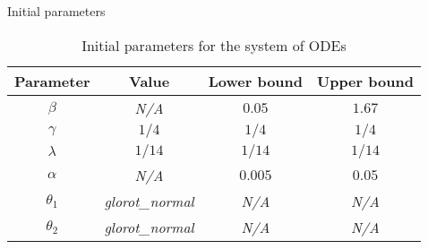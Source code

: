 \begin{frame}{Initial parameters}
    \begin{table}[h]
        \centering
        \begin{tabular}{| c | c | c | c |}
            Parameter & Value & Lower bound & Upper bound \\
            \hline\hline
            $\beta$ & \textit{N/A} & $0.05$ & $1.67$ \\
            \hline
            $\gamma$ & $1/4$ & $1/4$ & $1/4$ \\
            \hline
            $\lambda$ & $1/14$ & $1/14$ & $1/14$ \\
            \hline
            $\alpha$ & \textit{N/A} & $0.005$ & $0.05$ \\
            \hline
            $\theta_1$ & \textit{glorot\_normal} & \textit{N/A} & \textit{N/A} \\
            \hline
            $\theta_2$ & \textit{glorot\_normal} & \textit{N/A} & \textit{N/A} \\
            \hline
        \end{tabular}
        \caption{Initial parameters for the system of \glspl{ODE}}
        \label{tab:ude-model-initial-parameters}
    \end{table}
\end{frame}
